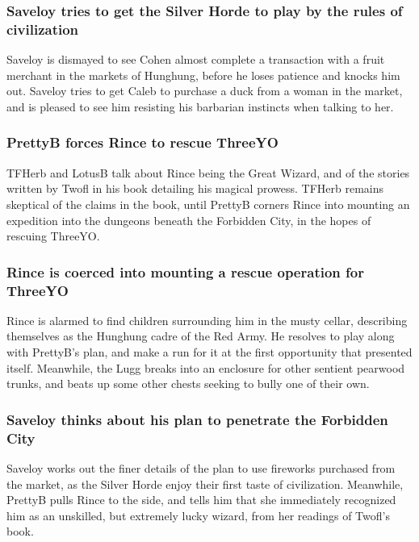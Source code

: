 \subsubsection{\Gls{Saveloy} tries to get the Silver Horde to play by the rules of civilization}
\Gls{Saveloy} is dismayed to see \Gls{Cohen} almost complete a transaction with a fruit merchant in
the markets of Hunghung, before he loses patience and knocks him out. \Gls{Saveloy} tries to get
\Gls{Caleb} to purchase a duck from a woman in the market, and is pleased to see him resisting
his barbarian instincts when talking to her.

\subsubsection{\Gls{PrettyB} forces \Gls{Rince} to rescue \Gls{ThreeYO}}
\Gls{TFHerb} and \Gls{LotusB} talk about \Gls{Rince} being the Great Wizard, and of the stories
written by \Gls{Twofl} in his book detailing his magical prowess. \Gls{TFHerb} remains skeptical of
the claims in the book, until \Gls{PrettyB} corners \Gls{Rince} into mounting an expedition into
the dungeons beneath the Forbidden City, in the hopes of rescuing \Gls{ThreeYO}.

\subsubsection{\Gls{Rince} is coerced into mounting a rescue operation for \Gls{ThreeYO}}
\Gls{Rince} is alarmed to find children surrounding him in the musty cellar, describing themselves
as the Hunghung cadre of the Red Army. He resolves to play along with \Gls{PrettyB}'s plan, and
make a run for it at the first opportunity that presented itself. Meanwhile, the \Gls{Lugg} breaks
into an enclosure for other sentient pearwood trunks, and beats up some other chests seeking to
bully one of their own.

\subsubsection{\Gls{Saveloy} thinks about his plan to penetrate the Forbidden City}
\Gls{Saveloy} works out the finer details of the plan to use fireworks purchased from the market,
as the Silver Horde enjoy their first taste of civilization. Meanwhile, \Gls{PrettyB} pulls
\Gls{Rince} to the side, and tells him that she immediately recognized him as an unskilled, but
extremely lucky wizard, from her readings of \Gls{Twofl}'s book.

